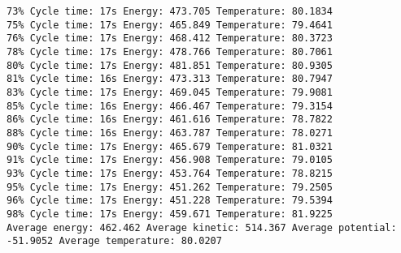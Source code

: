 \documentclass{article}
\begin{document}
\begin{verbatim}
73% Cycle time: 17s Energy: 473.705 Temperature: 80.1834
75% Cycle time: 17s Energy: 465.849 Temperature: 79.4641
76% Cycle time: 17s Energy: 468.412 Temperature: 80.3723
78% Cycle time: 17s Energy: 478.766 Temperature: 80.7061
80% Cycle time: 17s Energy: 481.851 Temperature: 80.9305
81% Cycle time: 16s Energy: 473.313 Temperature: 80.7947
83% Cycle time: 17s Energy: 469.045 Temperature: 79.9081
85% Cycle time: 16s Energy: 466.467 Temperature: 79.3154
86% Cycle time: 16s Energy: 461.616 Temperature: 78.7822
88% Cycle time: 16s Energy: 463.787 Temperature: 78.0271
90% Cycle time: 17s Energy: 465.679 Temperature: 81.0321
91% Cycle time: 17s Energy: 456.908 Temperature: 79.0105
93% Cycle time: 17s Energy: 453.764 Temperature: 78.8215
95% Cycle time: 17s Energy: 451.262 Temperature: 79.2505
96% Cycle time: 17s Energy: 451.228 Temperature: 79.5394
98% Cycle time: 17s Energy: 459.671 Temperature: 81.9225
Average energy: 462.462 Average kinetic: 514.367 Average potential: -51.9052 Average temperature: 80.0207


\end{verbatim}
\end{document}
